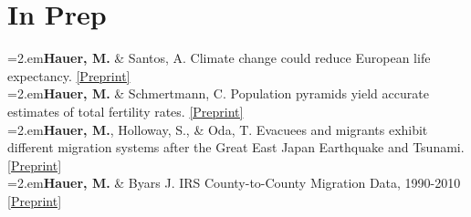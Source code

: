 \section{In Prep}

  \hangindent=2.em\textbf{Hauer, M.} \& Santos, A. Climate change could reduce European life expectancy. \href{https://osf.io/preprints/socarxiv/ngtxr}{[Preprint]}\\  
  
     \hangindent=2.em\textbf{Hauer, M.} \& Schmertmann, C. Population pyramids yield accurate estimates of total fertility rates. \href{https://osf.io/preprints/socarxiv/2f3v6/}{[Preprint]}\\
  
    \hangindent=2.em\textbf{Hauer, M.}, Holloway, S., \& Oda, T. Evacuees and migrants exhibit different migration systems after the Great East Japan Earthquake and Tsunami. \href{https://osf.io/preprints/socarxiv/76y5z}{[Preprint]}\\

      \hangindent=2.em\textbf{Hauer, M.} \& Byars J. IRS County-to-County Migration Data, 1990-2010 \href{https://osf.io/preprints/socarxiv/zmp4t/}{[Preprint]}\\  

    
 
    
  
    




